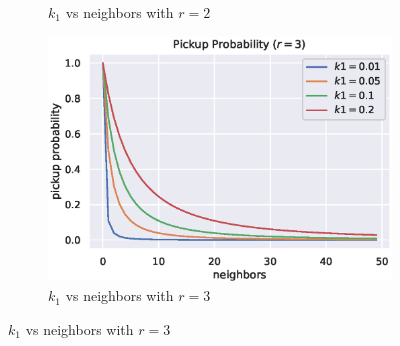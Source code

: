 \documentclass[12pt]{article}
\begin{document}
\begin{figure}[H]
\begin{subfigure}[t]{0.32\textwidth}
        \caption{$k_1$ vs neighbors with $r=2$}
    \end{subfigure}%
    \begin{subfigure}[t]{0.32\textwidth}
        \centering
        \includegraphics[width=\textwidth]{figures/aca/k1-r3.eps}
        \caption{$k_1$ vs neighbors with $r=3$}
    \end{subfigure}


\end{figure}
\end{document}
